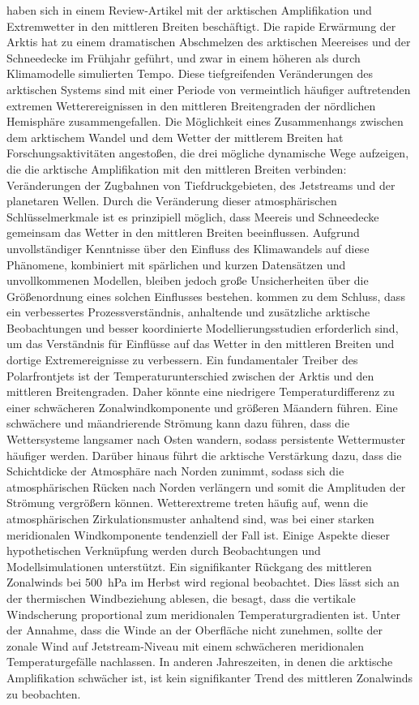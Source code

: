 \citet{cohen-2014} haben sich in einem Review-Artikel mit der arktischen Amplifikation und Extremwetter in den mittleren Breiten beschäftigt. Die rapide Erwärmung der Arktis hat zu einem dramatischen Abschmelzen des arktischen Meereises und der Schneedecke im Frühjahr geführt, und zwar in einem höheren als durch Klimamodelle simulierten Tempo. Diese tiefgreifenden Veränderungen des arktischen Systems sind mit einer Periode von vermeintlich häufiger auftretenden extremen Wetterereignissen in den mittleren Breitengraden der nördlichen Hemisphäre zusammengefallen. Die Möglichkeit eines Zusammenhangs zwischen dem arktischem Wandel und dem Wetter der mittlerem Breiten hat Forschungsaktivitäten angestoßen, die drei mögliche dynamische Wege aufzeigen, die die arktische Amplifikation mit den mittleren Breiten verbinden: Veränderungen der Zugbahnen von Tiefdruckgebieten, des Jetstreams und der planetaren Wellen. Durch die Veränderung dieser atmosphärischen Schlüsselmerkmale ist es prinzipiell möglich, dass Meereis und Schneedecke gemeinsam das Wetter in den mittleren Breiten beeinflussen. Aufgrund unvollständiger Kenntnisse über den Einfluss des Klimawandels auf diese Phänomene, kombiniert mit spärlichen und kurzen Datensätzen und unvollkommenen Modellen, bleiben jedoch große Unsicherheiten über die Größenordnung eines solchen Einflusses bestehen. \citet{cohen-2014} kommen zu dem Schluss, dass ein verbessertes Prozessverständnis, anhaltende und zusätzliche arktische Beobachtungen und besser koordinierte Modellierungsstudien erforderlich sind, um das Verständnis für Einflüsse auf das Wetter in den mittleren Breiten und dortige Extremereignisse zu verbessern.
Ein fundamentaler Treiber des Polarfrontjets ist der Temperaturunterschied zwischen der Arktis und den mittleren Breitengraden. Daher könnte eine niedrigere Temperaturdifferenz zu einer schwächeren Zonalwindkomponente und größeren Mäandern führen. Eine schwächere und mäandrierende Strömung kann dazu führen, dass die Wettersysteme langsamer nach Osten wandern, sodass persistente Wettermuster häufiger werden. Darüber hinaus führt die arktische Verstärkung dazu, dass die Schichtdicke der Atmosphäre nach Norden zunimmt, sodass sich die atmosphärischen Rücken nach Norden verlängern und somit die Amplituden der Strömung vergrößern können. Wetterextreme treten häufig auf, wenn die atmosphärischen Zirkulationsmuster anhaltend sind, was bei einer starken meridionalen Windkomponente tendenziell der Fall ist.
Einige Aspekte dieser hypothetischen Verknüpfung werden durch Beobachtungen und Modellsimulationen unterstützt. Ein signifikanter Rückgang des mittleren Zonalwinds bei \SI{500}{\hecto\pascal} im Herbst wird regional beobachtet. Dies lässt sich an der thermischen Windbeziehung ablesen, die besagt, dass die vertikale Windscherung proportional zum meridionalen Temperaturgradienten ist. Unter der Annahme, dass die Winde an der Oberfläche nicht zunehmen, sollte der zonale Wind auf Jetstream-Niveau mit einem schwächeren meridionalen Temperaturgefälle nachlassen. In anderen Jahreszeiten, in denen die arktische Amplifikation schwächer ist, ist kein signifikanter Trend des mittleren Zonalwinds zu beobachten.
